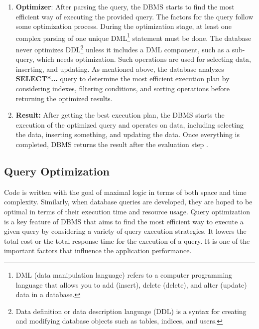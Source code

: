 \begin{enumerate}
\begin{enumerate}
    \end{enumerate}
    
    
    \item \textbf{Optimizer}: After parsing the query, the DBMS starts to find the most efficient way of executing the provided query. The factors for the query follow some optimization process. During the optimization stage, at least one complex parsing of one unique DML\footnote{DML  (data manipulation language) refers to a computer programming language that allows you to add (insert), delete (delete), and alter (update) data in a database.} statement must be done. The database never optimizes DDL\footnote{Data definition or data description language (DDL) is a syntax for creating and modifying database objects such as tables, indices, and users.} unless it includes a DML component, such as a sub-query, which needs optimization. Such operations are used for selecting data, inserting, and updating. As mentioned above, the database analyzes \textbf{SELECT*...} query to determine the most efficient execution plan by considering indexes, filtering conditions, and sorting operations before returning the optimized results. 
    
    \item \textbf{Result:} After getting the best execution plan, the DBMS starts the execution of the optimized query and operates on data, including selecting the data, inserting something, and updating the data. Once everything is completed, DBMS returns the result after the evaluation step \cite{Query,QueryProcessing,Oracle}.
    
\end{enumerate}

\subsection{Query Optimization } Code is written with the goal of maximal logic in terms of both space and time complexity. Similarly, when database queries are developed, they are hoped to be optimal in terms of their execution time and resource usage. Query optimization is a key feature of DBMS that aims to find the most efficient way to execute a given query by considering a variety of query execution strategies. It lowers the total cost or the total response time for the execution of a query. It is one of the important factors that influence the application performance.\vspace{.4cm}

